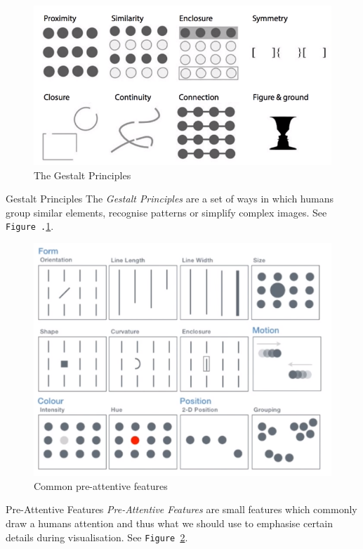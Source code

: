 \documentclass[11pt,a4paper]{article}
\begin{document}
  \begin{figure}[H]
    \centering\includegraphics[width=.7\textwidth]{GestaltPrinciples.PNG}
    \caption{The Gestalt Principles}
    \label{fig_Gestalt_Principles}
  \end{figure}

  \begin{proposition}{Gestalt Principles}
    The \textit{Gestalt Principles} are a set of ways in which humans group similar elements, recognise patterns or simplify complex images. See \texttt{Figure .\ref{fig_Gestalt_Principles}}.
  \end{proposition}

  \begin{figure}[H]
    \centering\includegraphics[width=.7\textwidth]{PreattentiveFeatures.PNG}
    \caption{Common pre-attentive features}
    \label{fig_preattentive_features}
  \end{figure}

  \begin{proposition}{Pre-Attentive Features}
    \textit{Pre-Attentive Features} are small features which commonly draw a humans attention and thus what we should use to emphasise certain details during visualisation. See \texttt{Figure \ref{fig_preattentive_features}}.
  \end{proposition}
\end{document}
